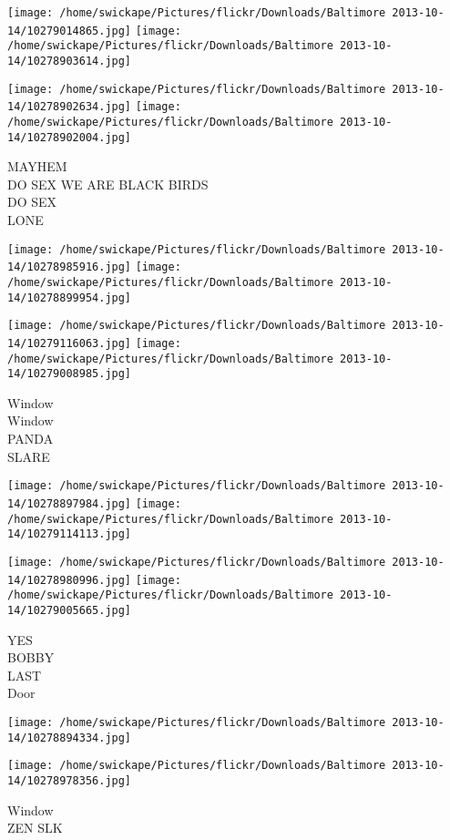 \documentclass[10pt,letterpaper]{article}
\begin{document}
\texttt{[image: /home/swickape/Pictures/flickr/Downloads/Baltimore 2013-10-14/10279014865.jpg]}
\texttt{[image: /home/swickape/Pictures/flickr/Downloads/Baltimore 2013-10-14/10278903614.jpg]}

\texttt{[image: /home/swickape/Pictures/flickr/Downloads/Baltimore 2013-10-14/10278902634.jpg]}
\texttt{[image: /home/swickape/Pictures/flickr/Downloads/Baltimore 2013-10-14/10278902004.jpg]}

MAYHEM\\
DO SEX WE ARE BLACK BIRDS\\
DO SEX\\
LONE
\pagebreak

\texttt{[image: /home/swickape/Pictures/flickr/Downloads/Baltimore 2013-10-14/10278985916.jpg]}
\texttt{[image: /home/swickape/Pictures/flickr/Downloads/Baltimore 2013-10-14/10278899954.jpg]}

\texttt{[image: /home/swickape/Pictures/flickr/Downloads/Baltimore 2013-10-14/10279116063.jpg]}
\texttt{[image: /home/swickape/Pictures/flickr/Downloads/Baltimore 2013-10-14/10279008985.jpg]}

Window\\
Window\\
PANDA\\
SLARE
\pagebreak

\texttt{[image: /home/swickape/Pictures/flickr/Downloads/Baltimore 2013-10-14/10278897984.jpg]}
\texttt{[image: /home/swickape/Pictures/flickr/Downloads/Baltimore 2013-10-14/10279114113.jpg]}

\texttt{[image: /home/swickape/Pictures/flickr/Downloads/Baltimore 2013-10-14/10278980996.jpg]}
\texttt{[image: /home/swickape/Pictures/flickr/Downloads/Baltimore 2013-10-14/10279005665.jpg]}

YES\\
BOBBY\\
LAST\\
Door
\pagebreak

\texttt{[image: /home/swickape/Pictures/flickr/Downloads/Baltimore 2013-10-14/10278894334.jpg]}

\vspace{0.25in}
\texttt{[image: /home/swickape/Pictures/flickr/Downloads/Baltimore 2013-10-14/10278978356.jpg]}

Window\\
ZEN SLK
\pagebreak
\end{document}
